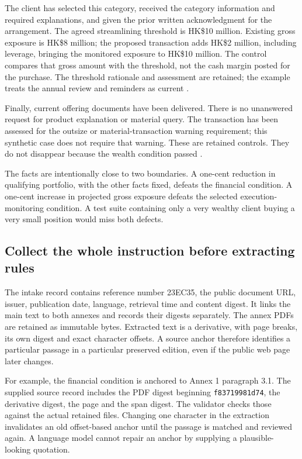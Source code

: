 \documentclass[12pt,a4paper,oneside,openany]{book}
\begin{document}
The client has selected this category, received the category information and
required explanations, and given the prior written acknowledgment for the
arrangement. The agreed streamlining threshold is HK\$10 million. Existing
gross exposure is HK\$8 million; the proposed transaction adds HK\$2 million,
including leverage, bringing the monitored exposure to HK\$10 million. The
control compares that gross amount with the threshold, not the cash margin
posted for the purchase. The threshold rationale and assessment are retained;
the example treats the annual review and reminders as current
\citep[Annex 1, paras.~6--8, 12--14; Annex 2, FAQ~7]{sfcspiannex1,sfcspiannex2}.

Finally, current offering documents have been delivered. There is no unanswered
request for product explanation or material query. The transaction has been
assessed for the outsize or material-transaction warning requirement; this
synthetic case does not require that warning. These are retained controls.
They do not disappear because the wealth condition passed
\citep[Annex 1, paras.~8.4, 10.3]{sfcspiannex1}.

The facts are intentionally close to two boundaries. A one-cent reduction in
qualifying portfolio, with the other facts fixed, defeats the financial
condition. A one-cent increase in projected gross exposure defeats the selected
execution-monitoring condition. A test suite containing only a very wealthy
client buying a very small position would miss both defects.

\subsection{Collect the whole instruction before extracting rules}
\label{merge:P-01b-complete-dry-run:02}


The intake record contains reference number 23EC35, the public document URL,
issuer, publication date, language, retrieval time and content digest. It
links the main text to both annexes and records their digests separately.
The annex PDFs are retained as immutable bytes. Extracted text is a derivative,
with page breaks, its own digest and exact character offsets. A source anchor
therefore identifies a particular passage in a particular preserved edition,
even if the public web page later changes.

For example, the financial condition is anchored to Annex 1 paragraph 3.1.
The supplied source record includes the PDF digest beginning
\texttt{f83719981d74}, the derivative digest, the page and the span digest.
The validator checks those against the actual retained files. Changing one
character in the extraction invalidates an old offset-based anchor until the
passage is matched and reviewed again. A language model cannot repair an anchor
by supplying a plausible-looking quotation.
\end{document}
